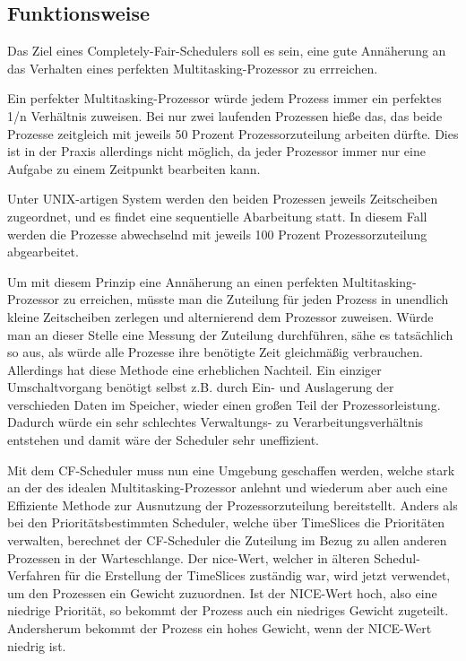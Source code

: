 \subsection{Funktionsweise}
Das Ziel eines \glqq Completely-Fair-Schedulers\grqq{} soll es sein, eine gute Annäherung an das Verhalten eines perfekten Multitasking-Prozessor zu errreichen.

Ein perfekter Multi\-tasking-Prozessor würde jedem Prozess immer ein perfektes 1/n Verhältnis zuweisen. 
Bei nur zwei laufenden Prozessen hieße das, das beide Prozesse zeitgleich mit jeweils 50 Prozent Prozessorzuteilung arbeiten dürfte. Dies ist in der Praxis allerdings nicht möglich, da jeder Prozessor immer nur eine Aufgabe zu einem Zeitpunkt bearbeiten kann.

Unter UNIX-artigen System werden den beiden Prozessen jeweils Zeitscheiben zugeordnet, und es findet eine sequentielle Abarbeitung statt. In diesem Fall werden die Prozesse abwechselnd mit jeweils 100 Prozent Prozessorzuteilung abgearbeitet.

Um mit diesem Prinzip eine Annäherung an einen perfekten Multitasking-Prozessor zu erreichen, müsste man die Zuteilung für jeden Prozess in unendlich kleine Zeitscheiben zerlegen und alternierend dem Prozessor zuweisen. Würde man an dieser Stelle eine Messung der Zuteilung durchführen, sähe es tatsächlich so aus, als würde alle Prozesse ihre benötigte Zeit gleichmäßig verbrauchen.
Allerdings hat diese Methode eine erheblichen Nachteil. Ein einziger Umschalt\-vorgang be\-nötigt selbst z.B. durch Ein- und Auslagerung der verschieden Daten im Speicher, wieder einen großen Teil der Prozessorleistung. Dadurch würde ein sehr schlechtes Verwaltungs- zu Verarbeitungsverhältnis entstehen und damit wäre der Scheduler sehr uneffizient.

Mit dem CF-Scheduler muss nun eine Umgebung geschaffen werden, welche stark an der des idealen Multitasking-Prozessor anlehnt und wiederum aber auch eine Effiziente Methode zur Ausnutzung der Prozessorzuteilung bereitstellt.
Anders als bei den Prioritätsbestimmten Scheduler, welche über TimeSlices die Prioritäten verwalten, berechnet der CF-Scheduler die Zuteilung im Bezug zu allen anderen Prozessen in der Warteschlange. Der nice-Wert, welcher in älteren Schedul-Ver\-fahren für die Erstellung der TimeSlices zuständig war, wird jetzt verwendet, um den Prozessen ein Gewicht zuzuordnen. Ist der NICE-Wert hoch, also eine niedrige Priorität, so bekommt der Prozess auch ein niedriges Gewicht zugeteilt. Andersherum bekommt der Prozess ein hohes Gewicht, wenn der NICE-Wert niedrig ist.

